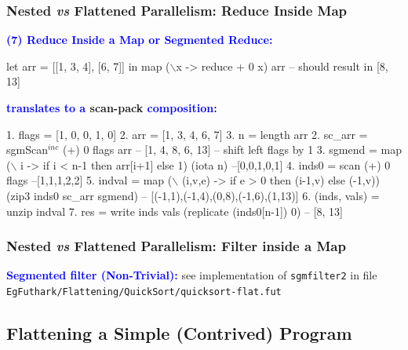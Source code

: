 \documentclass{beamer}
\newcommand{\blue}[1]{\textcolor{Blue}{{#1}}}
\renewcommand{\emph}[1]{\textcolor{structure}{#1}}
\newcommand{\emp}[1]{\textcolor{DikuRed}{ #1}}
\newcommand{\mymath}[1]{$ #1 $}
\newcommand{\myindu}[1]{^{#1}}
\begin{document}
\begin{frame}[fragile,t]
  \frametitle{Nested {\it vs} Flattened Parallelism: Reduce Inside Map}

\blue{\bf (7) Reduce Inside a Map or Segmented Reduce:} 

\begin{colorcode}[fontsize=\scriptsize]
let arr = [[1, 3, 4], [6, 7]] in
map (\mymath{\backslash}x -> reduce + 0 x) arr 
-- should result in [8, 13]
\end{colorcode}

\bigskip
\pause

\textbf{\blue{translates to a} \emp{scan-}\emph{pack} \blue{composition}:}
\bigskip

\begin{colorcode}[fontsize=\scriptsize]
1. flags  = [1, 0, 0, 1, 0]
2. arr    = [1, 3, 4, 6, 7]
3. n      = length arr
2. sc_arr = \emp{sgmScan\mymath{\myindu{inc}}} (+) 0 flags arr -- [1, 4, 8, 6, 13]
-- shift left flags by 1
3. sgmend = map (\mymath{\backslash} i -> if i < n-1 then arr[i+1] else 1) (iota n) --[0,0,1,0,1]
4. inds0  = \emp{scan} (+) 0 flags                                      --[1,1,1,2,2]
5. indval = map (\mymath{\backslash} (i,v,e) -> if e > 0 then (i-1,v) else (-1,v))  
                (zip3 inds0 sc_arr sgmend) -- [(-1,1),(-1,4),(0,8),(-1,6),(1,13)]
6. (inds, vals) = unzip indval
7. res    = \emph{write} inds vals (replicate (inds0[n-1]) 0) -- [8, 13]
\end{colorcode}

\end{frame}

\begin{frame}[fragile,t]
  \frametitle{Nested {\it vs} Flattened Parallelism: Filter inside a Map}

\blue{\bf Segmented filter (Non-Trivial):} see implementation of {\tt sgmfilter2} in file \\
{\tt EgFuthark/Flattening/QuickSort/quicksort-flat.fut}

\end{frame}


\subsection{Flattening a Simple (Contrived) Program}
\end{document}

